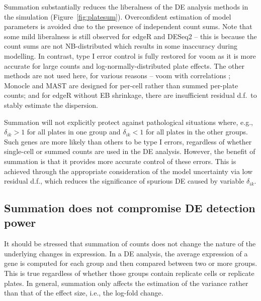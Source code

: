 \documentclass[oupdraft]{bio}
\begin{document}
Summation substantially reduces the liberalness of the DE analysis methods in the simulation (Figure~\ref{fig:platesum}).
Overconfident estimation of model parameters is avoided due to the presence of independent count sums.
Note that some mild liberalness is still observed for edgeR and DESeq2 
    -- this is because the count sums are not NB-distributed which results in some inaccuracy during modelling.
In contrast, type I error control is fully restored for voom as it is more accurate for large counts and log-normally-distributed plate effects.
The other methods are not used here, for various reasons -- voom with correlations ;
    Monocle and MAST are designed for per-cell rather than summed per-plate counts;
    and for edgeR without EB shrinkage, there are insufficient residual d.f.\ to stably estimate the dispersion.

Summation will not explicitly protect against pathological situations where, e.g., $\delta_{ik} > 1$ for all plates in one group and $\delta_{ik} < 1$ for all plates in the other groups.
Such genes are more likely than others to be type I errors, regardless of whether single-cell or summed counts are used in the DE analysis.
However, the benefit of summation is that it provides more accurate control of these errors.
This is achieved through the appropriate consideration of the model uncertainty via low residual d.f., which reduces the significance of spurious DE caused by variable $\delta_{ik}$.

\subsection{Summation does not compromise DE detection power}
It should be stressed that summation of counts does not change the nature of the underlying changes in expression.
In a DE analysis, the average expression of a gene is computed for each group and then compared between two or more groups.
This is true regardless of whether those groups contain replicate cells or replicate plates. 
In general, summation only affects the estimation of the variance rather than that of the effect size, i.e., the log-fold change.
\end{document}
